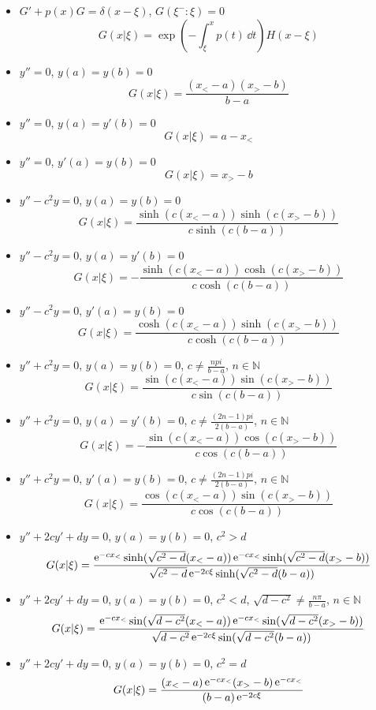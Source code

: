 \begin{itemize}
\item
  $G' + p(x) G = \delta(x-\xi)$, $G(\xi^-:\xi) = 0$
  \[
  G(x|\xi) = \exp \left( - \int_\xi^x p(t) \,\dd t \right) H(x-\xi)
  \]
\item
  $y'' = 0$, $y(a) = y(b) = 0$
  \[
  G(x|\xi) = \frac{ (x_< - a) (x_> - b) }
  { b-a }
  \]
\item
  $y'' = 0$, $y(a) = y'(b) = 0$
  \[
  G(x|\xi) = a - x_<
  \]
\item
  $y'' = 0$, $y'(a) = y(b) = 0$
  \[
  G(x|\xi) = x_> - b
  \]
\item
  $y'' - c^2 y = 0$, $y(a) = y(b) = 0$
  \[
  G(x|\xi) = \frac{ \sinh( c (x_< - a) ) \sinh( c (x_> - b) ) }
  { c \sinh( c (b-a) ) }
  \]
\item
  $y'' - c^2 y = 0$, $y(a) = y'(b) = 0$
  \[
  G(x|\xi) = - \frac{ \sinh( c (x_< - a) ) \cosh( c (x_> - b) ) }
  { c \cosh( c (b-a) ) }
  \]
\item
  $y'' - c^2 y = 0$, $y'(a) = y(b) = 0$
  \[
  G(x|\xi) = \frac{ \cosh( c (x_< - a) ) \sinh( c (x_> - b) ) }
  { c \cosh( c (b-a) ) }
  \]
\item
  $y'' + c^2 y = 0$, $y(a) = y(b) = 0$, $c \neq \frac{n pi}{b-a}$, 
  $n \in \mathbb{N}$
  \[
  G(x|\xi) = \frac{ \sin( c (x_< - a) ) \sin( c (x_> - b) ) }
  { c \sin( c (b-a) ) }
  \]
\item
  $y'' + c^2 y = 0$, $y(a) = y'(b) = 0$, $c \neq \frac{(2n-1) pi}{2(b-a)}$, 
  $n \in \mathbb{N}$
  \[
  G(x|\xi) = - \frac{ \sin( c (x_< - a) ) \cos( c (x_> - b) ) }
  { c \cos( c (b-a) ) }
  \]
\item
  $y'' + c^2 y = 0$, $y'(a) = y(b) = 0$, $c \neq \frac{(2n-1) pi}{2(b-a)}$, 
  $n \in \mathbb{N}$
  \[
  G(x|\xi) = \frac{ \cos( c (x_< - a) ) \sin( c (x_> - b) ) }
  { c \cos( c (b-a) ) }
  \]
\item
  $y'' + 2 c y' + d y = 0$, $y(a) = y(b) = 0$, $c^2 > d$
  \[
  G(x|\xi) = \frac{ \mathop{\mathrm{e}}\nolimits^{-c x_<} \sinh( \sqrt{ c^2 - d } (x_< - a) ) 
    \mathop{\mathrm{e}}\nolimits^{-c x_<} \sinh( \sqrt{ c^2 - d } (x_> - b) ) }
  { \sqrt{c^2 - d} \mathop{\mathrm{e}}\nolimits^{-2 c \xi} \sinh( \sqrt{c^2 - d} (b-a) ) }
  \]
\item
  $y'' + 2 c y' + d y = 0$, $y(a) = y(b) = 0$, $c^2 < d$, 
  $\sqrt{d - c^2} \neq \frac{n \pi}{b-a}$, $n \in \mathbb{N}$
  \[
  G(x|\xi) = \frac{ \mathop{\mathrm{e}}\nolimits^{-c x_<} \sin( \sqrt{ d - c^2 } (x_< - a) ) 
    \mathop{\mathrm{e}}\nolimits^{-c x_<} \sin( \sqrt{ d - c^2 } (x_> - b) ) }
  { \sqrt{d - c^2} \mathop{\mathrm{e}}\nolimits^{-2 c \xi} \sin( \sqrt{d - c^2} (b-a) ) }
  \]
\item
  $y'' + 2 c y' + d y = 0$, $y(a) = y(b) = 0$, $c^2 = d$
  \[
  G(x|\xi) = \frac{ (x_< - a) \mathop{\mathrm{e}}\nolimits^{-c x_<} (x_> - b) \mathop{\mathrm{e}}\nolimits^{-c x_<} }
  { (b-a) \mathop{\mathrm{e}}\nolimits^{-2 c \xi} }
  \]
\end{itemize}


